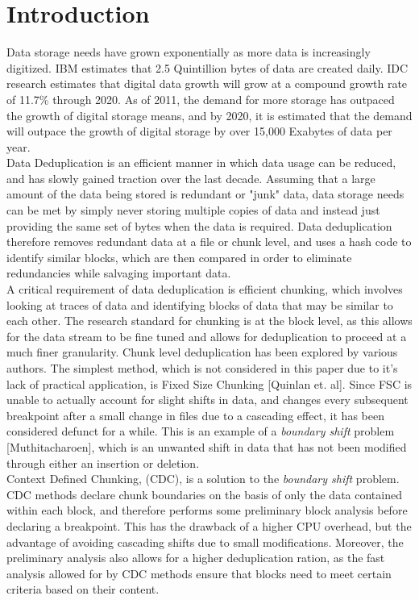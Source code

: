 \documentclass{acmtog} %
\begin{document}
	\section{Introduction}
	Data storage needs have grown exponentially as more data is increasingly digitized. IBM estimates that 2.5 Quintillion bytes of data are created daily. IDC research estimates that digital data growth will grow at a compound growth rate of 11.7\% through 2020. As of 2011, the demand for more storage has outpaced the growth of digital storage means, and by 2020, it is estimated that the demand will outpace the growth of digital storage by over 15,000 Exabytes of data per year. \\
		
		Data Deduplication is an efficient manner in which data usage can be reduced, and has slowly gained traction over the last decade. Assuming that a large amount of the data being stored is redundant or "junk" data, data storage needs can be met by simply never storing multiple copies of data and instead just providing the same set of bytes when the data is required. Data deduplication therefore removes redundant data at a file or chunk level, and uses a hash code to identify similar blocks, which are then compared in order to eliminate redundancies while salvaging important data. \\
		
		A critical requirement of data deduplication is efficient chunking, which involves looking at traces of data and identifying blocks of data that may be similar to each other. The research standard for chunking is at the block level, as this allows for the data stream to be fine tuned and allows for deduplication to proceed at a much finer granularity. Chunk level deduplication has been explored by various authors. The simplest method, which is not considered in this paper due to it's lack of practical application, is Fixed Size Chunking [Quinlan et. al]. Since FSC is unable to actually account for slight shifts in data, and changes every subsequent breakpoint after a small change in files due to a cascading effect, it has been considered defunct for a while. This is an example of a \textit{boundary shift} problem [Muthitacharoen], which is an unwanted shift in data that has not been modified through either an insertion or deletion.\\
		Context Defined Chunking, (CDC), is a solution to the \textit{boundary shift} problem. CDC methods declare chunk boundaries on the basis of only the data contained within each block, and therefore performs some preliminary block analysis before declaring a breakpoint. This has the drawback of a higher CPU overhead, but the advantage of avoiding cascading shifts due to small modifications. Moreover, the preliminary analysis also allows for a higher deduplication ration, as the fast analysis allowed for by CDC methods ensure that blocks need to meet certain criteria based on their content. \\
		
\end{document}

